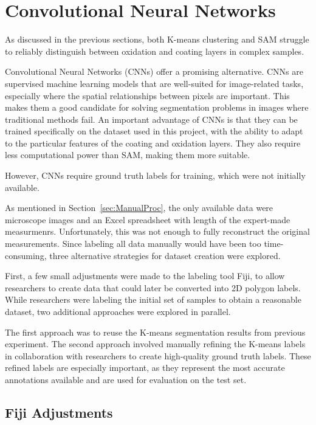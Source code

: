 
\section{Convolutional Neural Networks}\label{sec:cnn}

As discussed in the previous sections, both K-means clustering and SAM struggle to reliably distinguish between oxidation and coating layers in complex samples.

Convolutional Neural Networks (CNNs) \cite{oshea_introduction_2015} offer a promising alternative. CNNs are supervised machine learning models that are well-suited for image-related tasks, especially where the spatial relationships between pixels are important. This makes them a good candidate for solving segmentation problems in images where traditional methods fail. An important advantage of CNNs is that they can be trained specifically on the dataset used in this project, with the ability to adapt to the particular features of the coating and oxidation layers. They also require less computational power than SAM, making them more suitable.

However, CNNs require ground truth labels for training, which were not initially available.

As mentioned in Section~\ref{sec:ManualProc}, the only available data were microscope images and an Excel spreadsheet with length of the expert-made measurmenrs. Unfortunately, this was not enough to fully reconstruct the original measurements. Since labeling all data manually would have been too time-consuming, three alternative strategies for dataset creation were explored.

First, a few small adjustments were made to the labeling tool Fiji, to allow researchers to create data that could later be converted into 2D polygon labels. While researchers were labeling the initial set of samples to obtain a reasonable dataset, two additional approaches were explored in parallel.

The first approach was to reuse the K-means segmentation results from previous experiment. The second approach involved manually refining the K-means labels in collaboration with researchers to create high-quality ground truth labels. These refined labels are especially important, as they represent the most accurate annotations available and are used for evaluation on the test set.



\subsection{Fiji Adjustments}\label{sec:1.2.2}

